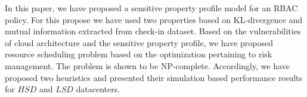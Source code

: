 In this paper, we have proposed a sensitive property profile model for an RBAC policy. For this propose we have used two properties based on KL-divergence and mutual information extracted from check-in dataset. Based on the vulnerabilities of cloud architecture and the sensitive property profile, we have proposed resource scheduling  problem based on the  optimization pertaining to risk management. The problem is shown to be NP-complete. Accordingly, we have proposed two heuristics and presented their  simulation based performance results for $HSD$ and $LSD$ datacenters.